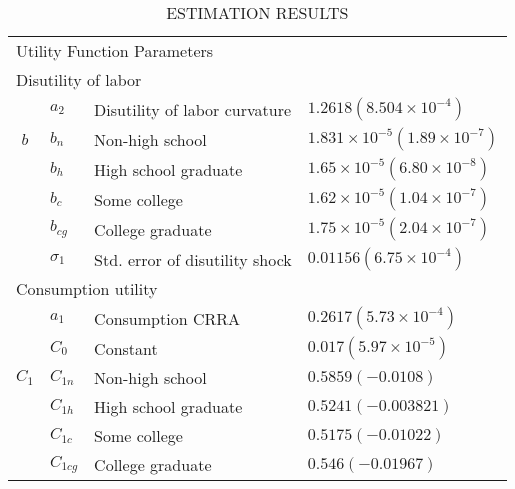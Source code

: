 \documentclass[10pt, letterpaper]{article}
\begin{document}
  \begin{longtable}{c l l l}
    \caption{ \\
      \scriptsize ESTIMATION RESULTS} \\  

  \hline%
    \multicolumn{3}{l}{Utility Function Parameters} & {}  \\
    \multicolumn{4}{l}{\quad Disutility of labor} \\ 
     {} &  $a_2$  & Disutility of labor curvature  & $1.2618 (8.504 \times 10^{-4})$ \\
    $b$ &  $b_n$  &   Non-high school &$1.831 \times 10^{-5} (1.89 \times 10^{-7})$ \\
    {} &   $b_h$  &  High school graduate  & $1.65 \times 10^{-5} (6.80 \times 10^{-8})$ \\
    {} &   $b_c$ &  Some college  & $1.62 \times 10^{-5} (1.04 \times 10^{-7})$ \\
    {} &   $b_{cg}$  &  College graduate  & $1.75 \times 10^{-5} (2.04 \times 10^{-7})$ \\
    {} &   $\sigma_1$ &  Std. error of disutility shock  & $0.01156 (6.75 \times 10^{-4})$ \\
    \multicolumn{4}{l}{Consumption utility}  \\
    {} &   $a_1 $  &  Consumption CRRA  &$0.2617 (5.73 \times 10^{-4}) $\\
    {} &   $C_0 $ &  Constant  & $0.017 (5.97 \times 10^{-5}) $\\
    $C_1$ &   $C_{1n} $ &   Non-high school  & $0.5859 (-0.0108) $\\
    {} &   $C_{1h} $&  High school graduate  & $0.5241 (-0.003821)$\\
    {} &    $C_{1c} $ &  Some college  & $0.5175 (-0.01022) $\\
    {} &    $C_{1cg} $&  College graduate  &$0.546 (-0.01967) $\\

\end{longtable}
\end{document}
